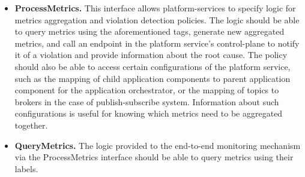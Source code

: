 \begin{itemize}
\item \textbf{ProcessMetrics. }This interface allows platform-services to specify logic for metrics aggregation and violation detection policies. The logic should be able to query metrics using the aforementioned tags, generate new aggregated metrics, and call an endpoint in the platform service's control-plane to notify it of a violation and provide information about the root cause. The policy should also be able to access certain configurations of the platform service, such as the mapping of child application components to parent application component for the application orchestrator, or the mapping of topics to brokers in the case of publish-subscribe system. Information about such configurations is useful for knowing which metrics need to be aggregated together.
\item \textbf{QueryMetrics. }The logic provided to the end-to-end monitoring mechanism via the ProcessMetrics interface should be able to query metrics using their labels.
\end{itemize}

